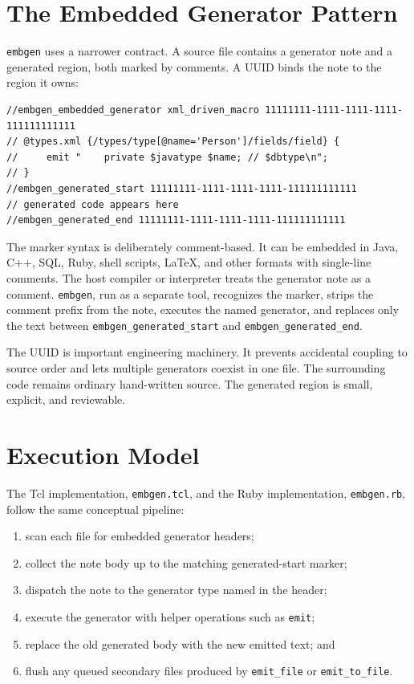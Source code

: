 \documentclass[11pt]{article}
\begin{document}
\section{The Embedded Generator Pattern}

\texttt{embgen} uses a narrower contract.  A source file contains a generator
note and a generated region, both marked by comments.  A UUID binds the note to
the region it owns:

\begin{lstlisting}[style=embgen]
//embgen_embedded_generator xml_driven_macro 11111111-1111-1111-1111-111111111111
// @types.xml {/types/type[@name='Person']/fields/field} {
//     emit "    private $javatype $name; // $dbtype\n";
// }
//embgen_generated_start 11111111-1111-1111-1111-111111111111
// generated code appears here
//embgen_generated_end 11111111-1111-1111-1111-111111111111
\end{lstlisting}

The marker syntax is deliberately comment-based.  It can be embedded in Java,
C++, SQL, Ruby, shell scripts, LaTeX, and other formats with single-line
comments.  The host compiler or interpreter treats the generator note as a
comment.  \texttt{embgen}, run as a separate tool, recognizes the marker,
strips the comment prefix from the note, executes the named generator, and
replaces only the text between \texttt{embgen\_generated\_start} and
\texttt{embgen\_generated\_end}.

The UUID is important engineering machinery.  It prevents accidental coupling
to source order and lets multiple generators coexist in one file.  The
surrounding code remains ordinary hand-written source.  The generated region is
small, explicit, and reviewable.

\section{Execution Model}

The Tcl implementation, \texttt{embgen.tcl}, and the Ruby implementation,
\texttt{embgen.rb}, follow the same conceptual pipeline:

\begin{enumerate}
  \item scan each file for embedded generator headers;
  \item collect the note body up to the matching generated-start marker;
  \item dispatch the note to the generator type named in the header;
  \item execute the generator with helper operations such as \texttt{emit};
  \item replace the old generated body with the new emitted text; and
  \item flush any queued secondary files produced by \texttt{emit\_file} or
        \texttt{emit\_to\_file}.
\end{enumerate}
\end{document}

